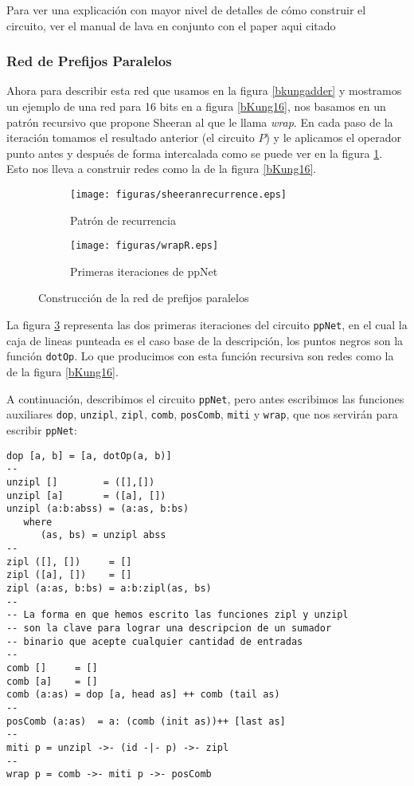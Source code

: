 Para ver una explicación con mayor nivel de detalles de cómo construir el circuito, ver el manual de lava \cite{Lava-tutorial} en conjunto con el paper aqui citado \cite{4638988}


\subsubsection {Red de Prefijos Paralelos}
\noindent Ahora para describir esta red que usamos en la figura \ref{bkungadder} y mostramos un ejemplo de una red para 16 bits en a figura \ref{bKung16}, nos basamos en un patrón recursivo que propone Sheeran \cite{Shee07} al que le llama \emph{wrap}. En cada paso de la iteración tomamos el resultado anterior (el circuito \(P\)) y le aplicamos el operador punto antes y después de forma intercalada como se puede ver en la figura \ref{sheeranrecurrence}. Esto nos lleva a construir redes como la de la figura \ref{bKung16}.




\begin{figure}[h!]
\centering
 \begin{subfigure}{0.3\textwidth}
    \centering
    \texttt{[image: figuras/sheeranrecurrence.eps]}
    \caption{Patrón de recurrencia}
    \label{sheeranrecurrence}
 \end{subfigure}
 \begin{subfigure}{0.4\textwidth}
    \centering
    \texttt{[image: figuras/wrapR.eps]}
    \caption{Primeras iteraciones de ppNet}
    \label{firstsiter}
 \end{subfigure}
 \caption{Construcción de la red de prefijos paralelos}
\end{figure}


La figura \ref{firstsiter} representa las dos primeras iteraciones del circuito \verb|ppNet|, en el cual la caja de lineas punteada es el caso base de la descripción, los puntos negros son la función \verb|dotOp|. Lo que producimos con esta función recursiva son redes como la de la figura \ref{bKung16}.

A continuación, describimos el circuito \verb|ppNet|, pero antes escribimos las funciones auxiliares \verb|dop|, \verb|unzipl|, \verb|zipl|, \verb|comb|, \verb|posComb|, \verb|miti| y \verb|wrap|, que nos servirán para escribir \verb|ppNet|:


\begin{lstlisting}
dop [a, b] = [a, dotOp(a, b)]
--
unzipl []        = ([],[])
unzipl [a]       = ([a], [])
unzipl (a:b:abss) = (a:as, b:bs)
   where
      (as, bs) = unzipl abss
--
zipl ([], [])     = []
zipl ([a], [])    = []
zipl (a:as, b:bs) = a:b:zipl(as, bs)
--
-- La forma en que hemos escrito las funciones zipl y unzipl 
-- son la clave para lograr una descripcion de un sumador 
-- binario que acepte cualquier cantidad de entradas
--
comb []     = []
comb [a]    = []
comb (a:as) = dop [a, head as] ++ comb (tail as)
--
posComb (a:as)  = a: (comb (init as))++ [last as]
--
miti p = unzipl ->- (id -|- p) ->- zipl
--
wrap p = comb ->- miti p ->- posComb 
\end{lstlisting}


